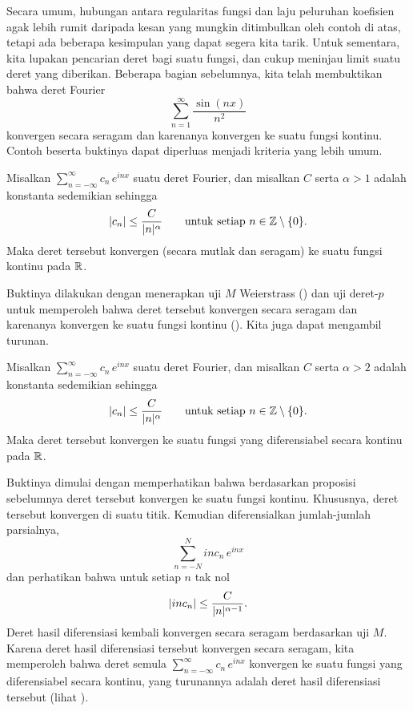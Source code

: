 Secara umum, hubungan antara regularitas fungsi dan
laju peluruhan koefisien agak lebih rumit
daripada kesan yang mungkin ditimbulkan oleh contoh di atas,
tetapi ada beberapa kesimpulan yang dapat segera kita tarik.
Untuk sementara, kita lupakan pencarian deret bagi suatu fungsi,
dan cukup meninjau limit suatu deret yang diberikan.
Beberapa bagian sebelumnya, kita telah membuktikan bahwa deret Fourier
\begin{equation*}
\sum_{n=1}^\infty \frac{\sin(nx)}{n^2}
\end{equation*}
konvergen secara seragam dan karenanya konvergen ke suatu fungsi kontinu. Contoh
beserta buktinya dapat diperluas menjadi kriteria yang lebih umum.

\begin{prop}
Misalkan $\sum_{n=-\infty}^\infty c_n\, e^{inx}$ suatu deret Fourier,
dan misalkan $C$ serta $\alpha > 1$ adalah konstanta sedemikian sehingga
\begin{equation*}
\sabs{c_n} \leq \frac{C}{\sabs{n}^\alpha}
\qquad \text{untuk setiap } n \in \Z \setminus \{ 0 \}.
\avoidbreak
\end{equation*}
Maka deret tersebut konvergen (secara mutlak dan seragam) ke suatu fungsi kontinu pada ${\mathbb{R}}$.
\end{prop}

Buktinya dilakukan dengan menerapkan uji $M$ Weierstrass () dan
uji deret-$p$ untuk memperoleh bahwa deret tersebut konvergen secara seragam dan karenanya
konvergen ke suatu fungsi kontinu ().
Kita juga dapat mengambil turunan.

\begin{prop}
Misalkan $\sum_{n=-\infty}^\infty c_n\, e^{inx}$ suatu deret Fourier,
dan misalkan $C$ serta $\alpha > 2$ adalah konstanta sedemikian sehingga
\begin{equation*}
\sabs{c_n} \leq \frac{C}{\sabs{n}^\alpha}
\qquad \text{untuk setiap } n \in \Z \setminus \{ 0 \}.
\avoidbreak
\end{equation*}
Maka deret tersebut konvergen ke suatu fungsi yang diferensiabel secara kontinu pada ${\mathbb{R}}$.
\end{prop}

Buktinya dimulai dengan memperhatikan bahwa berdasarkan proposisi sebelumnya
deret tersebut konvergen ke suatu fungsi kontinu.
Khususnya, deret tersebut konvergen di suatu titik.
Kemudian diferensialkan jumlah-jumlah parsialnya,
\begin{equation*}
\sum_{n=-N}^{N}
i n c_n \,e^{inx}
\end{equation*}
dan perhatikan bahwa untuk setiap $n$ tak nol
\begin{equation*}
\lvert {i n c_n} \rvert \leq \frac{C}{\lvert {n} \rvert^{\alpha-1}} .
\end{equation*}
Deret hasil diferensiasi kembali konvergen secara seragam berdasarkan uji $M$. Karena
deret hasil diferensiasi tersebut
konvergen secara seragam, kita memperoleh bahwa deret semula
$\sum_{n=-\infty}^\infty c_n\,e^{inx}$
konvergen
ke suatu fungsi yang diferensiabel secara kontinu, yang turunannya adalah
deret hasil diferensiasi tersebut (lihat ).


